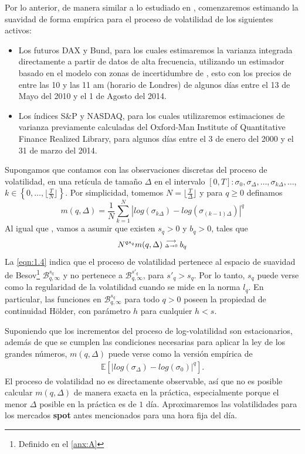 \documentclass[letterpaper,12pt,oneside]{book}
\theoremstyle{plain}
\numberwithin{theorem}{section}
\begin{document}
Por lo anterior, de manera similar a lo estudiado en \cite{gatheral_volatility_2018}, comenzaremos estimando la suavidad de forma empírica para el proceso de volatilidad de los siguientes activos:
\begin{itemize}
	\item Los futuros DAX y Bund, para los cuales estimaremos la varianza integrada directamente a partir de datos de alta frecuencia, utilizando un estimador basado en el modelo con zonas de incertidumbre de \cite{robert_volatility_2012}, %
esto con los precios de entre las 10 y las 11 am (horario de Londres) de algunos días entre el 13 de Mayo del 2010 y el 1 de Agosto del 2014.
	\item Los índices S\&P y NASDAQ, para los cuales utilizaremos estimaciones de varianza previamente calculadas del Oxford-Man Institute of Quantitative Finance Realized Library, para algunos días entre el 3 de enero del 2000 y el 31 de marzo del 2014.
\end{itemize}
Supongamos que contamos con las observaciones discretas del proceso de volatilidad, en una retícula de tamaño $\Delta$ en el intervalo $[0,T]: \sigma_0,\sigma_\Delta,\ldots, \sigma_{k\Delta},\ldots$, $k\in\left\{0,\ldots, \lfloor \frac{T}{N}\rfloor\right\}$. Por simplicidad, tomemos $N=\lfloor \frac{T}{\Delta}\rfloor$ y para $q\geq 0$ definamos
$$m(q,\Delta)=\frac{1}{N}\sum_{k=1}^N \left|log(\sigma_{k\Delta})-log(\sigma_{(k-1)\Delta})\right|^q$$
Al igual que \cite{rosenbaum_etude_2007}, vamos a asumir que existen $s_q>0$ y $b_q>0$, tales que
\begin{align}
	N^{qs_q}m(q,\Delta)\buildrel \longrightarrow\over{\scriptscriptstyle{\Delta\rightarrow 0}}b_q\label{eqn:1.4}
\end{align}
La \cref{eqn:1.4} indica que el proceso de volatilidad pertenece al espacio de suavidad de Besov\footnote{Definido en el \cref{anx:A}} $\mathcal{B}_{q, \infty}^{s_{q}}$ y no pertenece a $\mathcal{B}_{q, \infty}^{s'_{q}}$, para $s'_q> s_q$. Por lo tanto, $s_q$ puede verse como la regularidad de la volatilidad cuando se mide en la norma $l_q$. En particular, las funciones en $\mathcal{B}_{q, \infty}^{s_{q}}$ para todo $q>0$ poseen  la propiedad de continuidad Hölder, con parámetro $h$ para cualquier $h <s$.

Suponiendo que los incrementos del proceso de log-volatilidad son estacionarios, además de que se cumplen las condiciones necesarias para aplicar la ley de los grandes números, $m(q,\Delta)$ puede verse como la versión empírica de
\begin{align}
\mathbb E\left[\left|log(\sigma_\Delta)-log(\sigma_0)\right|^q\right].\label{eqn:1.5}
\end{align}
El proceso de volatilidad no es directamente observable, así que no es posible calcular $m(q,\Delta)$ de manera exacta en la práctica, especialmente porque el menor $\Delta$ posible en la práctica es de $1$ día.  Aproximaremos las volatilidades para los mercados \textbf{spot} antes mencionados para una hora fija del día.
\end{document}
